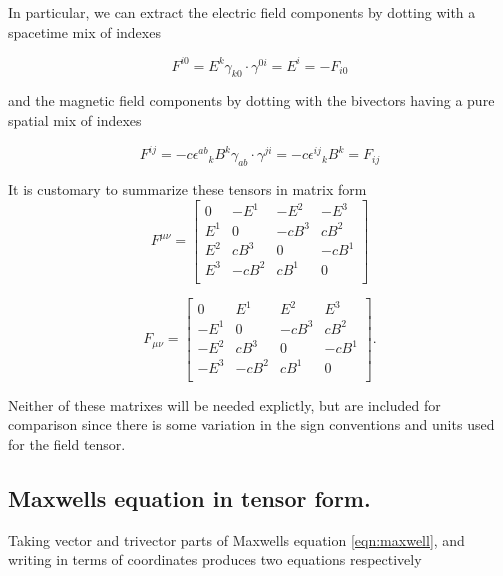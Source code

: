 \documentclass{article}
\begin{document}
In particular, we can extract the electric field components by dotting with a spacetime mix of indexes

\begin{equation*}
F^{i0} = E^k \gamma_{k0} \cdot \gamma^{0i} = E^i = -F_{i0}
\end{equation*}

and the magnetic field components by dotting with the bivectors having a pure spatial mix of indexes

\begin{equation*}
F^{ij} = - c {\epsilon^{a b}}_k B^k \gamma_{a b} \cdot \gamma^{ji} = - c {\epsilon^{i j}}_k B^k = F_{ij}
\end{equation*}

It is customary to summarize these tensors in matrix form
\begin{equation}\label{eqn:matrixtensor}
F^{\mu\nu} =
\begin{bmatrix}
0   & -E^1 & -E^2 & -E^3 \\
E^1 &   0  & -c B^3 &  c B^2 \\
E^2 &  c B^3 &   0  & -c B^1 \\
E^3 & -c B^2 &  c B^1 &   0  \\
\end{bmatrix}
\end{equation}

\begin{equation}
F_{\mu\nu} =
\begin{bmatrix}
0   & E^1 & E^2 & E^3 \\
-E^1 &   0  & -c B^3 &  c B^2 \\
-E^2 &  c B^3 &   0  & -c B^1 \\
-E^3 & -c B^2 &  c B^1 &   0  \\
\end{bmatrix}.
\end{equation}

Neither of these matrixes will be needed explictly, but are included for comparison since there is some variation in the sign conventions and units used
for the field tensor.

\subsection{ Maxwells equation in tensor form. }

Taking vector and trivector parts of Maxwells equation \ref{eqn:maxwell}, and writing in terms of coordinates produces two equations respectively
\end{document}
